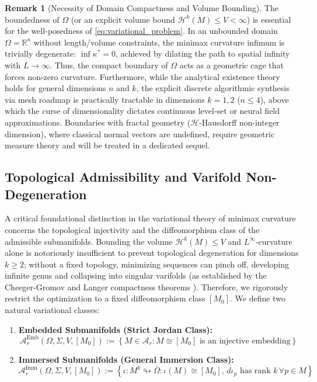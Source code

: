 \documentclass[11pt,reqno]{amsart}
\theoremstyle{definition}
\newtheorem{remark}[theorem]{Remark}
\providecommand{\R}{\mathbb{R}}
\providecommand{\Hsn}{\mathcal{H}}
\numberwithin{equation}{section}
\providecommand{\R}{\mathbb{R}}
\providecommand{\Hsn}{\mathcal{H}}
\begin{document}
\begin{remark}[Necessity of Domain Compactness and Volume Bounding]
\label{rem:compactness_necessity}
The boundedness of $\Omega$ (or an explicit volume bound $\Hsn^k(M) \le V < \infty$) is essential for the well-posedness of \eqref{eq:variational_problem}. In an unbounded domain $\Omega = \R^n$ without length/volume constraints, the minimax curvature infimum is trivially degenerate: $\inf \kappa^* = 0$, achieved by dilating the path to spatial infinity with $L \to \infty$. Thus, the compact boundary of $\Omega$ acts as a geometric cage that forces non-zero curvature. Furthermore, while the analytical existence theory holds for general dimensions $n$ and $k$, the explicit discrete algorithmic synthesis via mesh roadmap is practically tractable in dimensions $k=1, 2$ ($n \le 4$), above which the curse of dimensionality dictates continuous level-set or neural field approximations. Boundaries with fractal geometry ($\Hsn$-Hausdorff non-integer dimension), where classical normal vectors are undefined, require geometric measure theory and will be treated in a dedicated sequel.
\end{remark}

\subsection{Topological Admissibility and Varifold Non-Degeneration}
\label{subsec:embeddings_vs_immersions}
A critical foundational distinction in the variational theory of minimax curvature concerns the topological injectivity and the diffeomorphism class of the admissible submanifolds. Bounding the volume $\Hsn^k(M) \le V$ and $L^\infty$-curvature alone is notoriously insufficient to prevent topological degeneration for dimensions $k \ge 2$; without a fixed topology, minimizing sequences can pinch off, developing infinite genus and collapsing into singular varifolds (as established by the Cheeger-Gromov and Langer compactness theorems \cite{langer1985}). Therefore, we rigorously restrict the optimization to a fixed diffeomorphism class $[M_0]$. We define two natural variational classes:
\begin{enumerate}
    \item \textbf{Embedded Submanifolds (Strict Jordan Class):}
    \begin{equation}
    \mathcal{A}_r^{\mathrm{Emb}}(\Omega, \Sigma, V, [M_0]) := \left\{ M \in \mathcal{A}_r : M \cong [M_0] \text{ is an injective embedding} \right\}
    \end{equation}
    \item \textbf{Immersed Submanifolds (General Immersion Class):}
    \begin{equation}
    \mathcal{A}_r^{\mathrm{Imm}}(\Omega, \Sigma, V, [M_0]) := \left\{ \iota: M^k \looparrowright \bar{\Omega} : \iota(M) \cong [M_0], \, d\iota_p \text{ has rank } k \, \forall p \in M \right\}
    \end{equation}
\end{enumerate}
\end{document}
